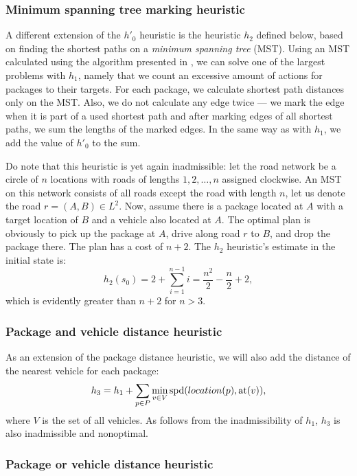 \subsubsection{Minimum spanning tree marking heuristic}\label{sfa2}

A different extension of the $h'_0$ heuristic
is the heuristic $h_2$ defined below, based
on finding the shortest paths on a \textit{minimum spanning tree} (MST).
Using an MST calculated using the algorithm presented in \citet{Kruskal1956}, we can solve one of the largest problems with $h_1$,
namely that we count an excessive amount of \drive{} actions
for packages to their targets.
For each package, we calculate
shortest path distances only on the MST.
Also, we do not calculate any edge twice --- we mark
the edge when it is part of a used shortest path and
after marking edges of all shortest paths,
we sum the lengths of the marked edges.
In the same way as with $h_1$, we add the value of $h'_0$ to
the sum.

Do note that this heuristic is yet again inadmissible:
let the road network be a circle of $n$ locations with
roads of lengths $1, 2, \ldots, n$ assigned clockwise.
An MST on this network consists of all roads except the road
with length $n$, let us denote the road $r = (A, B) \in L^2$.
Now, assume there is a package located at $A$ with a target
location of $B$ and a vehicle also located at $A$.
The optimal plan is obviously to pick up the package at $A$,
drive along road $r$ to $B$, and drop the package there.
The plan has a cost of $n+2$. The $h_2$ heuristic's estimate
in the initial state is:
$$h_2(s_0) = 2 + \sum_{i=1}^{n-1} i = \frac{n^2}{2} - \frac{n}{2} + 2,$$
which is evidently greater than $n+2$ for $n > 3$.

\subsubsection{Package and vehicle distance heuristic}\label{sfa3}

As an extension of the package distance heuristic,
we will also add the distance of the nearest vehicle for
each package:
$$h_3 = h_1 + \sum_{p \in P} \min_{v \in V} \textrm{spd}(location(p), \textrm{at}(v)),$$
where $V$ is the set of all vehicles.
As follows from the inadmissibility of $h_1$, $h_3$
is also inadmissible and nonoptimal.

\subsubsection{Package or vehicle distance heuristic}\label{sfa4}

